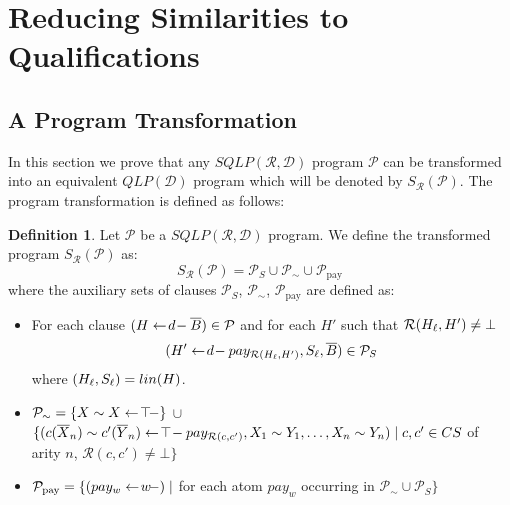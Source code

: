 \documentclass{sigplanconf}
\newcommand{\qdom}{\mathcal{D}} \newcommand{\dqdom}{D \setminus \{\bot\}} \newcommand{\bqdom}{(D \setminus \{\bot\}) \uplus \{?\}}
\newcommand{\simrel}{\mathcal{R}}
\newcommand{\qlp}[1]{QLP({#1})} \newcommand{\slp}[2]{SLP({#1,#2})} \newcommand{\sqlp}[2]{SQLP({#1,#2})} \newcommand{\bqlp}[1]{BQLP({#1})} \newcommand{\clp}[1]{CLP({#1})}
\newcommand{\trans}[2]{S_{#1}(#2)}
\newcommand{\Prog}{\mathcal{P}} \newcommand{\UProg}{\mathcal{P_U}}
\theoremstyle{definition}
\newtheorem{definition}{Definition}
\theoremstyle{plain}
\begin{document}
\section{Reducing Similarities to Qualifications} \label{Reduction}

\subsection{A Program Transformation} \label{sec:PT}

In this section we prove that any $\sqlp{\simrel}{\qdom}$ program $\Prog$ can be transformed into an equivalent $\qlp{\qdom}$ program which will be denoted by $\trans{\simrel}{\Prog}$. The program transformation is defined as follows:

\begin{definition} \label{def:trans}
Let $\Prog$ be a $\sqlp{\simrel}{\qdom}$ program. We define the transformed program $\trans{\simrel}{\Prog}$ as:
$$
\trans{\simrel}{\Prog} = \Prog_S \cup \Prog_\sim \cup
\Prog_{\mathrm{pay}}
$$
where the auxiliary sets of clauses $\Prog_S$, $\Prog_\sim$, $\Prog_{\mathrm{pay}}$ are defined as:
\begin{itemize}
\item For each clause $(H \qgets{d} \ats{B}) \in \Prog$ and for each $H'$ such that $\simrel(\linear{H},H') \neq \bot$
$$
(H' \qgets{d} pay_{\simrel(\linear{H},H')}, \linear{S}, \ats{B}) \in
\mathcal{P}_S
$$
where $(H_\ell, S_\ell) = lin(H)$.
\item $\Prog_\sim = \{X \sim X \qgets{\top} \}$ $\cup$
      $\{ (c(\overline{X}_n) \sim c'(\overline{Y}_n) \qgets{\top} pay_{\simrel(c,c')}, X_1 \sim Y_1, \dots, X_n \sim Y_n)  \mid c, c' \in CS$ of arity $n$, $\simrel(c,c') \neq \bot \}$
\item $\Prog_{\mathrm{pay}} = \{ (pay_w \qgets{w}) \mid $ for each atom $pay_w$ occurring in $\Prog_\sim \cup \Prog_S \}$
\end{itemize}
\end{definition}
\end{document}
